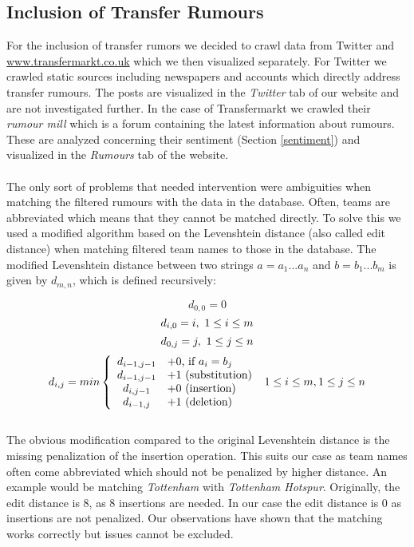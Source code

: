 \documentclass{article}
\begin{document}
\subsection{Inclusion of Transfer Rumours}
For the inclusion of transfer rumors we decided to crawl data from Twitter and \url{www.transfermarkt.co.uk} which we then visualized separately. For Twitter we crawled static sources including newspapers and accounts which directly address transfer rumours. The posts are visualized in the \emph{Twitter} tab of our website and are not investigated further. In the case of Transfermarkt we crawled their \emph{rumour mill} which is a forum containing the latest information about rumours. These are analyzed concerning their sentiment (Section \ref{sentiment}) and visualized in the \emph{Rumours} tab of the website.
\\ \\
The only sort of problems that needed intervention were ambiguities when matching the filtered rumours with the data in the database. Often, teams are abbreviated which means that they cannot be matched directly. To solve this we used a modified algorithm based on the Levenshtein distance (also called edit distance) when matching filtered team names to those in the database. The modified Levenshtein distance between two strings $a = a_1 ... a_n$ and $b = b_1 ... b_m$ is given by $d_{m,n}$, which is defined recursively:

\begin{equation}
d_{0,0} = 0
\label{eq1}
\end{equation}
\begin{equation}
d_{i,0} = i, \mbox{ } 1 \leq i \leq m \\
\label{eq2}
\end{equation}
\begin{equation}
d_{0,j} = j, \mbox{ } 1 \leq j \leq n \\
\label{eq3}
\end{equation}
\begin{equation}
d_{i,j} = min \left\{\begin{array}{cl} d_{i-1,j-1} & +0 \mbox{, if } a_i = b_j\\ d_{i-1,j-1} & +1 \mbox{ (substitution)} \\ d_{i,j-1} & +0 \mbox{ (insertion)} \\ d_{i-1,j} & +1 \mbox{ (deletion)}  \end{array}\right. \mbox{  } 1 \leq i \leq m, 1 \leq j \leq n \\
\label{eq4}
\end{equation}
\\
The obvious modification compared to the original Levenshtein distance is the missing penalization of the insertion operation. This suits our case as team names often come abbreviated which should not be penalized by higher distance. An example would be matching \emph{Tottenham} with \emph{Tottenham Hotspur}. Originally, the edit distance is 8, as 8 insertions are needed. In our case the edit distance is 0 as insertions are not penalized. Our observations have shown that the matching works correctly but issues cannot be excluded.
\end{document}
